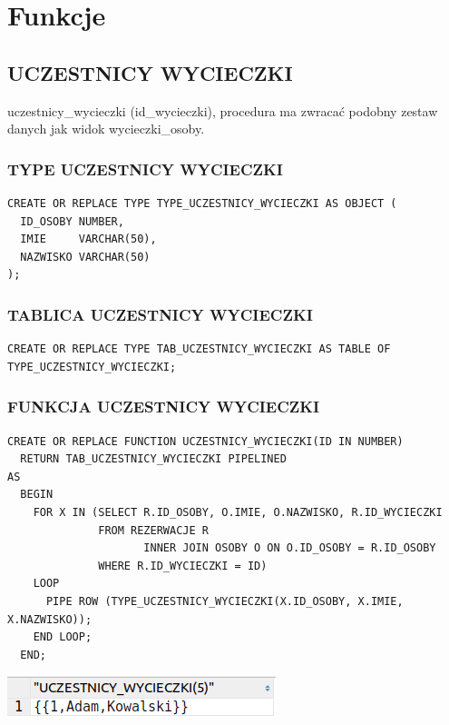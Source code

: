 \newpage
\section{Funkcje}

\subsection{UCZESTNICY WYCIECZKI}
uczestnicy\_wycieczki (id\_wycieczki), procedura ma zwracać podobny zestaw danych jak
widok wycieczki\_osoby.

\subsubsection{TYPE UCZESTNICY WYCIECZKI}
\begin{verbatim}
CREATE OR REPLACE TYPE TYPE_UCZESTNICY_WYCIECZKI AS OBJECT (
  ID_OSOBY NUMBER,
  IMIE     VARCHAR(50),
  NAZWISKO VARCHAR(50)
);
\end{verbatim}

\subsubsection{TABLICA UCZESTNICY WYCIECZKI}
\begin{verbatim}
CREATE OR REPLACE TYPE TAB_UCZESTNICY_WYCIECZKI AS TABLE OF TYPE_UCZESTNICY_WYCIECZKI;
\end{verbatim}


\subsubsection{FUNKCJA UCZESTNICY WYCIECZKI}
\begin{verbatim}
CREATE OR REPLACE FUNCTION UCZESTNICY_WYCIECZKI(ID IN NUMBER)
  RETURN TAB_UCZESTNICY_WYCIECZKI PIPELINED
AS
  BEGIN
    FOR X IN (SELECT R.ID_OSOBY, O.IMIE, O.NAZWISKO, R.ID_WYCIECZKI
              FROM REZERWACJE R
                     INNER JOIN OSOBY O ON O.ID_OSOBY = R.ID_OSOBY
              WHERE R.ID_WYCIECZKI = ID)
    LOOP
      PIPE ROW (TYPE_UCZESTNICY_WYCIECZKI(X.ID_OSOBY, X.IMIE, X.NAZWISKO));
    END LOOP;
  END;
\end{verbatim}

\begin{minipage}{0.40\textwidth}
\includegraphics[width=\linewidth]{./images/uczestnicy_wycieczki.png}
\end{minipage}

